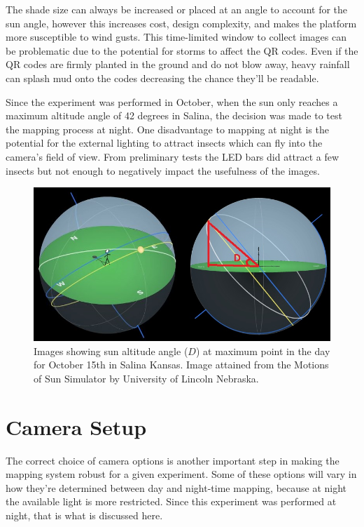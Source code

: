 The shade size can always be increased or placed at an angle to account for the sun angle, however this increases cost, design complexity, and makes the platform more susceptible to wind gusts.  This time-limited window to collect images can be problematic due to the potential for storms to affect the QR codes.  Even if the QR codes are firmly planted in the ground and do not blow away, heavy rainfall can splash mud onto the codes decreasing the chance they'll be readable. 

Since the experiment was performed in October, when the sun only reaches a maximum altitude angle of 42 degrees in Salina, the decision was made to test the mapping process at night.  One disadvantage to mapping at night is the potential for the external lighting to attract insects which can fly into the camera's field of view.  From preliminary tests the LED bars did attract a few insects but not enough to negatively impact the usefulness of the images.

\begin{figure}
	\centering
    \includegraphics[width=5in]{figures/sun_angle2.jpg}
    \caption[Sun angle]{Images showing sun altitude angle ($D$) at maximum point in the day for October 15th in Salina Kansas.  Image attained from the Motions of Sun Simulator by University of Lincoln Nebraska.}
    \label{figure:sun_angle}
\end{figure}  

\section{Camera Setup}

The correct choice of camera options is another important step in making the mapping system robust for a given experiment.  Some of these options will vary in how they're determined between day and night-time mapping, because at night the available light is more restricted.  Since this experiment was performed at night, that is what is discussed here.

